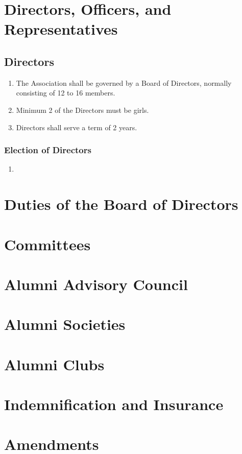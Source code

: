 \documentclass[a4paper,11pt]{book}
\begin{document}
\chapter{Directors, Officers, and Representatives}
\section{Directors}
\begin{enumerate}
\item The Association shall be governed by a Board of Directors, normally consisting of 12 to 16 members.
\item Minimum 2 of the Directors must be girls.
\item Directors shall serve a term of 2 years.
\end{enumerate}
\subsection{Election of Directors}
\begin{enumerate}
\item 
\end{enumerate}
\chapter{Duties of the Board of Directors}
\chapter{Committees}

\chapter{Alumni Advisory Council}
\chapter{ Alumni Societies }
\chapter{ Alumni Clubs }
\chapter{ Indemnification and Insurance}
\chapter{ Amendments }
\end{document}
